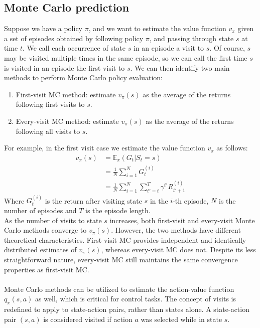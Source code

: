 \subsection{Monte Carlo prediction}
Suppose we have a policy $\pi$, and we want to estimate the value function $v_{\pi}$ given a set of episodes obtained by following policy $\pi$, and passing through state $s$ at time $t$. We call each occurrence of state $s$ in an episode a visit to $s$. Of course, $s$ may be visited multiple times in the same episode, so we can call the first time $s$ is visited in an episode the first visit to $s$. We can then identify two main methods to perform Monte Carlo policy evaluation:
\begin{enumerate}
    \item First-visit MC method: estimate $v_{\pi}(s)$ as the average of the returns following first visits to $s$.
    \item Every-visit MC method: estimate $v_{\pi}(s)$ as the average of the returns following all visits to $s$.
\end{enumerate}
For example, in the first visit case we estimate the value function $v_{\pi}$ as follows:
\begin{equation}
    \begin{split}
    v_{\pi}(s) & = \mathds{E}_{\pi}(G_t | S_t = s)\\
    & = \frac{1}{N} \sum_{i=1}^N G_t^{(i)}\\
    & = \frac{1}{N} \sum_{i=1}^N \sum_{t'=t}^{T} \gamma^{t'} R_{t'+1}^{(i)}
    \end{split}
    \label{mc-prediction}
\end{equation}
Where $G_t^{(i)}$ is the return after visiting state $s$ in the $i$-th episode, $N$ is the number of episodes and $T$ is the episode length.\\
As the number of visits to state $s$ increases, both first-visit and every-visit Monte Carlo methods converge to $v_{\pi}(s)$. However, the two methods have different theoretical characteristics. First-visit MC provides independent and identically distributed estimates of $v_{\pi}(s)$, whereas every-visit MC does not. Despite its less straightforward nature, every-visit MC still maintains the same convergence properties as first-visit MC.\\\\
Monte Carlo methods can be utilized to estimate the action-value function $q_{\pi}(s, a)$ as well, which is critical for control tasks. The concept of visits is redefined to apply to state-action pairs, rather than states alone. A state-action pair $(s, a)$ is considered visited if action $a$ was selected while in state $s$.

